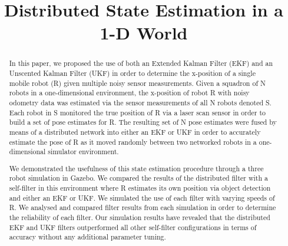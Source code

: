 \documentclass[conference]{IEEEtran} \usepackage[T1]{fontenc} \usepackage[backend=biber, style=ieee]{biblatex}
\begin{document}
\title{Distributed State Estimation in a 1-D World}


\author{   }

\maketitle

\begin{abstract}
In this paper, we proposed the use of both an Extended Kalman Filter (EKF) and an Unscented Kalman
Filter (UKF) in order to determine the x-position of a single mobile robot (R) given multiple noisy sensor measurements.
Given a squadron of N robots in a one-dimensional environment, the x-position of robot R with noisy odometry data was
estimated via the sensor measurements of all N robots denoted S. Each robot in S monitored the true position of R via
a laser scan sensor in order to build a set of pose estimates for R. The resulting set of N pose estimates were fused
by means of a distributed network into either an EKF or UKF in order to accurately estimate the pose of R as it moved 
randomly between two networked robots in a one-dimensional simulator environment.

We demonstrated the usefulness of this state estimation procedure through a three robot simulation in Gazebo. We compared
the results of the distributed filter with a self-filter in this environment where R estimates its own position via
object detection and either an EKF or UKF. We simulated the use of each filter with varying speeds of R. We analysed and
compared filter results from each simulation in order to determine the reliability of each filter. Our simulation results
have revealed that the distributed EKF and UKF filters outperformed all other self-filter configurations in terms of accuracy 
without any additional parameter tuning.
\end{abstract}
\end{document}
